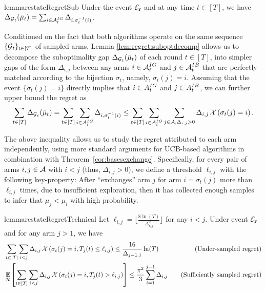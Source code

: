 \begin{restatable}{lemma}{restateRegretSub} \label{lem:regret:suboptdecomp} Under the event $\mathcal{E}_{\operatorname{\mathbf{r}}}$ and at any time $t \in [T]$, we have 
$\Delta_{\operatorname{\mathcal{G}}_t}(\bar{\mu}_t) = \sum_{i \in \operatorname{\mathcal{A}}^{IG}_t} \Delta_{i , \sigma^{-1}_{t}(i)}$.
\end{restatable}
Conditioned on the fact that both algorithms operate on the same sequence $\{\operatorname{\mathcal{G}}_t\}_{t \in [T]}$ of sampled arms, Lemma \ref{lem:regret:suboptdecomp} allows us to decompose the suboptimality gap $\Delta_{\operatorname{\mathcal{G}}_t}(\bar{\mu}_t)$ of each round $t \in [T]$, into simpler gaps of the form $\Delta_{i,j}$ between any arms $i \in \operatorname{\mathcal{A}}^{IG}_t$ and $j \in \operatorname{\mathcal{A}}^{IB}_t$ that are perfectly matched according to the bijection $\sigma_t$, namely, $\sigma_t(j) = i$. Assuming that the event $\{\sigma_t(j) = i\}$ directly implies that $i \in A^{IG}_t$ and $j \in A^{IB}_t$, we can further upper bound the regret as
\begin{align*}
\sum_{t \in [T]} \Delta_{\operatorname{\mathcal{G}}_t}(\bar{\mu}_t) = \sum_{t \in [T]} \sum_{i \in \operatorname{\mathcal{A}}^{IG}_t} \Delta_{i , \sigma^{-1}_{t}(i)} \leq \sum_{t \in [T]} \sum_{i \in \operatorname{\mathcal{A}}^{IG}_t} \sum_{j \in \operatorname{\mathcal{A}}, \Delta_{i,j} > 0} \Delta_{i,j} \mathop{\mathcal{X}\left(\sigma_t(j)=i\right)}.
\end{align*}

The above inequality allows us to study the regret attributed to each arm independently, using more standard arguments for UCB-based algorithms in combination with Theorem~\ref{cor:basesexchange}. Specifically, for every pair of arms $i,j \in \operatorname{\mathcal{A}}$ with $i < j$ (thus, $\Delta_{i,j} > 0$), we define a threshold $\ell_{i,j}$ with the following key-property: After \UCB ``exchanges'' arm $j$ for arm $i = \sigma_t(j)$ more than $\ell_{i,j}$ times, due to insufficient exploration, then it has collected enough samples to infer that $\mu_j < \mu_i$ with high probability. 
\begin{restatable}{lemma}{restateRegretTechnical} \label{lem:regret:technical}
Let $\ell_{i,j} = \bigg\lfloor \frac{8 \ln(T)}{\Delta^2_{i,j}}\bigg\rfloor$ for any $i<j$. Under event $\mathcal{E}_{\operatorname{\mathbf{r}}}$ and for any arm $j>1$, we have
\vspace{-1em}
\begin{align}
&\sum_{t \in [T]} \sum_{i < j} \Delta_{i , j} \mathop{\mathcal{X}\left(\sigma_t(j)=i, T_j(t) \leq \ell_{i,j}\right)} \leq \frac{16}{\Delta_{j-1,j}} \ln( T) &\quad\text{(Under-sampled regret)} \label{inq:reg:under}\\
& \mathop{\underset{\mathcal{R}}{\mathbb{E}}\left[\sum_{t \in [T]} \sum_{i < j} \Delta_{i , j} \mathop{\mathcal{X}\left(\sigma_t(j)=i, T_j(t) > \ell_{i,j}\right)}\right]} \leq \frac{\pi^2}{3}\sum^{j-1}_{i=1} \Delta_{i,j} &\quad\text{(Sufficiently sampled regret)} \label{inq:reg:sufficiently}
\end{align}
\end{restatable}



